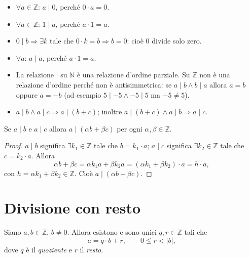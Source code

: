 \documentclass[11pt,a4paper]{article}
\begin{document}
\begin{osservazione}
\begin{itemize}
  \item $\forall a \in \mathbb{Z}$: $a \mid 0$, perché $0\cdot a = 0$.
  \item $\forall a \in \mathbb{Z}$: $1 \mid a$, perché $a\cdot 1 = a$.
  \item $0 \mid b \Rightarrow \exists k$ tale che $0\cdot k = b \Rightarrow b = 0$: cioè $0$ divide solo zero.
  \item $\forall a$: $a \mid a$, perché $a\cdot 1 = a$.
  \item La relazione $\mid$ su $\mathbb{N}$ è una relazione d'ordine parziale. Su $\mathbb{Z}$ non è una relazione d'ordine perché non è antisimmetrica: se $a \mid b \wedge b \mid a$ allora $a = b$ oppure $a = -b$ (ad esempio $5 \mid -5 \wedge -5 \mid 5$ ma $-5 \neq 5$).
  \item $a \mid b \wedge a \mid c \Rightarrow a \mid (b + c)$; inoltre $a \mid (b + c) \wedge a \mid b \Rightarrow a \mid c$.
\end{itemize}
\end{osservazione}

\begin{proposizione}[Lemma]
Se $a \mid b$ e $a \mid c$ allora $a \mid (\alpha b + \beta c)$ per ogni $\alpha, \beta \in \mathbb{Z}$.
\end{proposizione}

\begin{proof}
$a \mid b$ significa $\exists k_1 \in \mathbb{Z}$ tale che $b = k_1\cdot a$; $a \mid c$ significa $\exists k_2 \in \mathbb{Z}$ tale che $c = k_2\cdot a$. Allora
\[
  \alpha b + \beta c = \alpha k_1 a + \beta k_2 a = (\alpha k_1 + \beta k_2)\cdot a = h\cdot a ,
\]
con $h = \alpha k_1 + \beta k_2 \in \mathbb{Z}$. Cioè $a \mid (\alpha b + \beta c)$.
\end{proof}

\section{Divisione con resto}

\begin{proposizione}
Siano $a, b \in \mathbb{Z}$, $b \neq 0$. Allora esistono e sono unici $q, r \in \mathbb{Z}$ tali che
\[
  a = q\cdot b + r, \qquad 0 \le r < |b| ,
\]
dove $q$ è il \emph{quoziente} e $r$ il \emph{resto}.
\end{proposizione}
\end{document}
